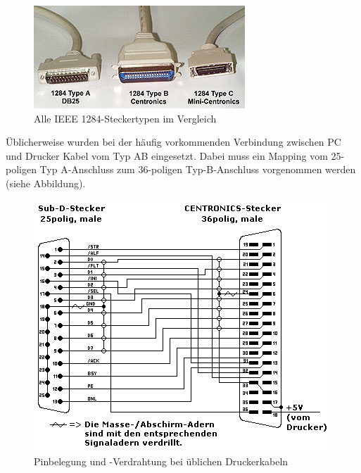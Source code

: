 \documentclass[a4paper,11pt]{article}
\begin{document}
\begin{figure}[h!]
 \centering
 \includegraphics{./pics/ieee1284_types.jpg}
 \caption{Alle IEEE 1284-Steckertypen im Vergleich} 	
\end{figure}


Üblicherweise wurden bei der häufig vorkommenden Verbindung zwischen PC und Drucker Kabel vom Typ AB eingesetzt. Dabei muss ein Mapping vom 25-poligen Typ A-Anschluss zum 36-poligen Typ-B-Anschluss vorgenommen werden (siehe Abbildung).  


\begin{figure}[h!]
 \centering
 \includegraphics[scale=0.7]{./pics/ieee1284_pinbelegungAB.png}
 \caption{Pinbelegung und -Verdrahtung bei üblichen Druckerkabeln} 	
\end{figure} 
\end{document}
